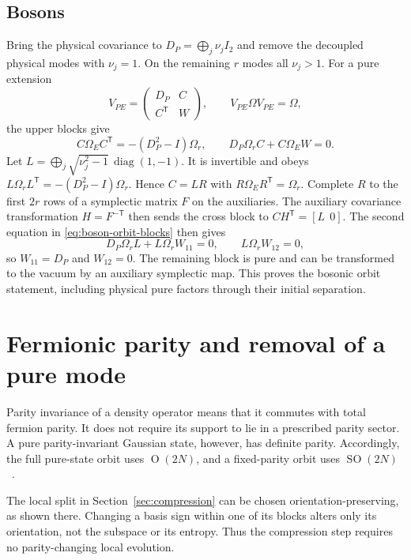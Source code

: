 \documentclass[11pt,a4paper]{article}
\numberwithin{equation}{section}
\theoremstyle{remark}
\newcommand{\C}{\mathbb C}
\newcommand{\T}{\mathsf T}
\newcommand{\diag}{\operatorname{diag}}
\newcommand{\SO}{\operatorname{SO}}
\newcommand{\OO}{\operatorname{O}}
\begin{document}
\subsection{Bosons}
Bring the physical covariance to $D_P=\bigoplus_j\nu_jI_2$ and remove the decoupled physical modes with $\nu_j=1$. On the remaining $r$ modes all $\nu_j>1$. For a pure extension
\begin{equation}
 V_{PE}=\begin{pmatrix}D_P&C\\C^{\T}&W\end{pmatrix},
 \qquad V_{PE}\Omega V_{PE}=\Omega,
\end{equation}
the upper blocks give
\begin{equation}\label{eq:boson-orbit-blocks}
 C\Omega_EC^{\T}=-(D_P^2-I)\Omega_r,\qquad
 D_P\Omega_rC+C\Omega_EW=0.
\end{equation}
Let $L=\bigoplus_j\sqrt{\nu_j^2-1}\,\diag(1,-1)$. It is invertible and obeys $L\Omega_rL^{\T}=-(D_P^2-I)\Omega_r$. Hence $C=LR$ with $R\Omega_ER^{\T}=\Omega_r$. Complete $R$ to the first $2r$ rows of a symplectic matrix $F$ on the auxiliaries. The auxiliary covariance transformation $H=F^{-\T}$ then sends the cross block to $CH^{\T}=[L\ \ 0]$. The second equation in \eqref{eq:boson-orbit-blocks} then gives
\begin{equation}
 D_P\Omega_rL+L\Omega_rW_{11}=0,\qquad L\Omega_rW_{12}=0,
\end{equation}
so $W_{11}=D_P$ and $W_{12}=0$. The remaining block is pure and can be transformed to the vacuum by an auxiliary symplectic map. This proves the bosonic orbit statement, including physical pure factors through their initial separation.

\section{Fermionic parity and removal of a pure mode}\label{app:parity}
Parity invariance of a density operator means that it commutes with total fermion parity. It does not require its support to lie in a prescribed parity sector. A pure parity-invariant Gaussian state, however, has definite parity. Accordingly, the full pure-state orbit uses $\OO(2N)$, and a fixed-parity orbit uses $\SO(2N)$~\cite{Windt2021,Hackl2021}.

The local split in Section~\ref{sec:compression} can be chosen orientation-preserving, as shown there. Changing a basis sign within one of its blocks alters only its orientation, not the subspace or its entropy. Thus the compression step requires no parity-changing local evolution.
\end{document}
